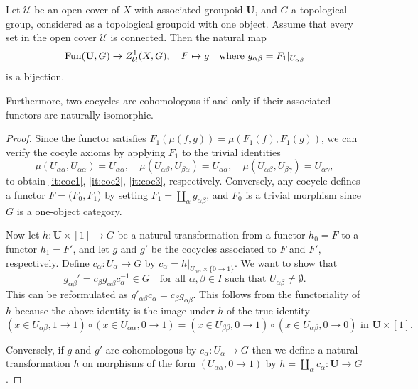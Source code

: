 \documentclass[a4paper,openany]{scrbook}
\begin{document}
\begin{prop} \label{prop:cocyclesasgroupoidmaps}
Let $\mathcal U$ be an open cover of $X$ with associated groupoid $\mathbf U$, and $G$ a topological group, considered as a topological groupoid with one object. Assume that every set in the open cover $\mathcal U$ is connected. Then the natural map
\[
\operatorname{Fun}(\mathbf U,G) \to Z^1_{\mathcal U}(X,G), \quad F \mapsto g \quad \text{where } g_{\alpha\beta} = F_1|_{U_{\alpha\beta}}
\]
is a bijection.

Furthermore, two cocycles are cohomologous if and only if their associated functors are naturally isomorphic.
\end{prop}
\begin{proof}
  Since the functor satisfies $F_1(\mu(f,g)) = \mu(F_1(f),F_1(g))$, we can verify the cocyle axioms by applying $F_1$ to the trivial identities 
  \[ 
      \mu(U_{\alpha\alpha},U_{\alpha\alpha}) = U_{\alpha\alpha},  \quad \mu(U_{\alpha\beta},U_{\beta\alpha}) = U_{\alpha\alpha}, \quad \mu(U_{\alpha\beta},U_{\beta\gamma}) = U_{\alpha\gamma}, 
  \] 
  to obtain \ref{it:coc1}, \ref{it:coc2}, \ref{it:coc3}, respectively.
  Conversely, any cocycle defines a functor $F=(F_0,F_1$) by setting $F_1=\coprod_{\alpha} g_{\alpha\beta}$, and $F_0$ is a trivial morphism since $G$ is a one-object category. 

  Now let $h\colon \mathbf U \times [1] \to G$ be a natural transformation from a functor $h_0=F$ to a functor $h_1=F'$, and let $g$ and $g'$ be the cocycles associated to $F$ and $F'$, respectively. Define $c_\alpha\colon U_\alpha \to G$ by $c_\alpha = h|_{U_{\alpha\alpha} \times \{0\to 1\} }$. We want to show that
\[
g_{\alpha\beta}' = c_\beta g_{\alpha\beta} c_\alpha^{-1} \in G \quad \text{for all } \alpha,\beta \in I \text{ such that } U_{\alpha\beta} \neq \emptyset.
\]
This can be reformulated as $g'_{\alpha\beta}c_\alpha = c_\beta g_{\alpha\beta}$. This follows from the functoriality of $h$ because the above identity is the image under $h$ of the true identity
\[
(x \in U_{\alpha\beta},1 \to 1) \circ (x \in U_{\alpha\alpha},0 \to 1) = (x \in U_{\beta\beta},0\to 1) \circ (x \in U_{\alpha\beta},0 \to 0) \text{ in } \mathbf U \times [1].
\]

Conversely, if $g$ and $g'$ are cohomologous by $c_\alpha\colon U_\alpha \to G$ then we define a natural transformation $h$ on morphisms of the form $(U_{\alpha\alpha}, 0 \to 1 )$ by $ h= \coprod_{\alpha}c_{\alpha}\colon \mathbf U \to G$.
\end{proof}
\end{document}
